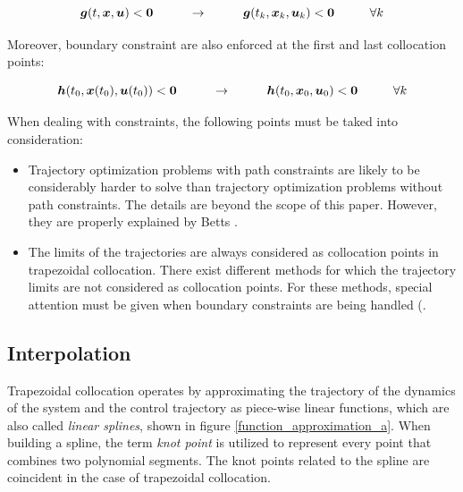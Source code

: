 \documentclass{thesisreport}
\begin{document}
 \begin{equation}
 \bm{g}(t, \bm{x},\bm{u}) < \bm{0} \text{\hspace{1cm}} \rightarrow \text{\hspace{1cm}} \bm{g}(t_k, \bm{x}_k, \bm{u}_k) <\bm{0} \text{\hspace{1cm}} \forall k \\
 \end{equation}
 
 Moreover, boundary constraint are also enforced at the first and last collocation points:
 
 \begin{equation}
 \bm{h}(t_0, \bm{x}(t_0),\bm{u}(t_0)) < \bm{0} \text{\hspace{1cm}} \rightarrow \text{\hspace{1cm}} \bm{h}(t_0, \bm{x}_0, \bm{u}_0) <\bm{0} \text{\hspace{1cm}} \forall k \\
 \end{equation} 
 
 
 When dealing with constraints, the following points must be taked into consideration: 
 
 \begin{itemize}
 	\item Trajectory optimization problems with path constraints are likely to be considerably harder to solve than trajectory optimization problems without path constraints. The details are beyond the scope of this paper. However, they are properly explained by Betts \cite{Betts2010}.
 	\item The limits of the trajectories are always considered as collocation points in trapezoidal collocation. There exist different methods for which the trajectory limits are not considered as collocation points. For these methods, special attention must be given when boundary constraints are being handled (\cite{Benson2006, Garg2010}.
 \end{itemize}
 
 \newpage
 
 
 \subsection{Interpolation}
 
 Trapezoidal collocation operates by approximating the trajectory of the dynamics of the system and the control trajectory as piece-wise linear functions, which are also called \textit{linear splines}, shown in figure \ref{function_approximation_a}. When building a spline, the term \textit{knot point} is utilized to represent every point that combines two polynomial segments. The knot points related to the spline are coincident in the case of trapezoidal collocation.  
 
\end{document}
